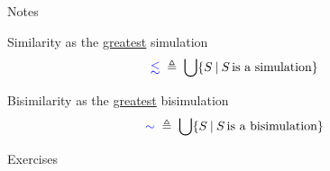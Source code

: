\documentclass{beamer}
\begin{document}
\begin{slide}{Notes}
\small
\begin{block}{Similarity as the \underline{greatest} simulation}
\begin{equation*}
\textcolor{blue}{\lesssim}\;  \triangleq\; \bigcup \mathopen{\{} S \mathbin{|} S\, \text{is a simulation} \mathclose{\}} 
\end{equation*}
\end{block}
\begin{block}{Bisimilarity as the \underline{greatest} bisimulation}
\begin{equation*}
\textcolor{blue}{\sim}\;  \triangleq\; \bigcup \mathopen{\{} S \mathbin{|} S\, \text{is a bisimulation} \mathclose{\}} 
\end{equation*}
\end{block}
\end{slide}


\begin{slide}{Exercises}
\end{slide}

\end{document}
